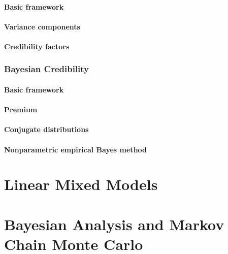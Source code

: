 \documentclass[english]{article}
\begin{document}
\begin{multicols*}{2}
\subsection{Basic framework}

 

\subsection{Variance components}



\subsection{Credibility factors}



\newpage
\section{Bayesian Credibility}\label{sec:Bayes}
\subsection{Basic framework}


\subsection{Premium}



\subsection{Conjugate distributions}

\subsection{Nonparametric empirical Bayes method}




\newpage
\part{Linear Mixed Models}\label{part:LMM}




\newpage
\part{Bayesian Analysis and Markov Chain Monte Carlo}\label{part:BAandMCMC}





\end{multicols*}
\end{document}
